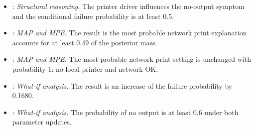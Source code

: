 \begingroup\footnotesize\raggedright
\begin{itemize}[nosep,leftmargin=*]
\item {}: \emph{Structural reasoning.}  The printer driver influences the no-output symptom and the conditional failure probability is at least 0.5.
\item {}: \emph{MAP and MPE.}  The result is the most probable network print explanation accounts for at least 0.49 of the posterior mass.
\item {}: \emph{MAP and MPE.}  The most probable network print setting is unchanged with probability 1: no local printer and network OK.
\item {}: \emph{What-if analysis.}  The result is an increase of the failure probability by 0.1680.
\item {}: \emph{What-if analysis.}  The probability of no output is at least 0.6 under both parameter updates.
\end{itemize}
\endgroup
